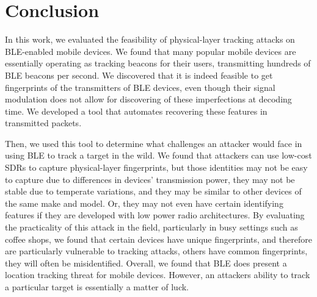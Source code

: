 \section{Conclusion}
\label{sec:conclusion}

In this work, we evaluated the feasibility of physical-layer tracking attacks
on BLE-enabled mobile devices. We found that many popular mobile devices are
essentially operating as tracking beacons for their users, transmitting
hundreds of BLE beacons per second. We discovered that it is indeed feasible to
get fingerprints of the transmitters of BLE devices, even though their signal
modulation does not allow for discovering of these imperfections at decoding
time. We developed a tool that automates recovering these features in
transmitted packets.

Then, we used this tool to determine what challenges an attacker would face in
using BLE to track a target in the wild. We found that attackers can use
low-cost SDRs to capture physical-layer fingerprints, but those identities may
not be easy to capture due to differences in devices' transmission power, they
may not be stable due to temperate variations, and they may be similar to other
devices of the same make and model. Or, they may not even have certain
identifying features if they are developed with low power radio architectures.
By evaluating the practicality of this attack in the field, particularly in
busy settings such as coffee shops, we found that certain devices have unique
fingerprints, and therefore are particularly vulnerable to tracking attacks,
others have common fingerprints, they will often be misidentified. Overall, we
found that BLE does present a location tracking threat for mobile devices.
However, an attackers ability to track a particular target is essentially a
matter of luck.

